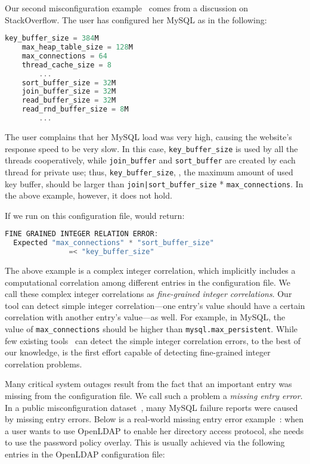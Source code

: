 \label{ex:fine}
Our second misconfiguration example~\cite{correlation} 
comes from a discussion on StackOverflow.
The user has configured her MySQL as in the following:

\begin{lstlisting}[language=C, xleftmargin=.01\textwidth]
    key_buffer_size = 384M
    max_heap_table_size = 128M
    max_connections = 64
    thread_cache_size = 8
        ...
    sort_buffer_size = 32M
    join_buffer_size = 32M
    read_buffer_size = 32M
    read_rnd_buffer_size = 8M
        ...
\end{lstlisting} 

The user complains that her MySQL load was very high, 
causing the website's
response speed to be very slow.
In this case, {\tt key\_buffer\_size} is used by all the threads
cooperatively, while {\tt join\_buffer} and {\tt sort\_buffer} are 
created by each thread for private use; thus, {\tt key\_buffer\_size},
\ie, the maximum amount of used key buffer, should be larger than 
{\tt join|sort\_buffer\_size} * {\tt max\_connections}. 
In the above example, however, it does not hold. 

If we run \app on this configuration file, \app  would return:

\begin{lstlisting}[language=C, xleftmargin=.01\textwidth]
  FINE GRAINED INTEGER RELATION ERROR:
  Expected "max_connections" * "sort_buffer_size"
               =< "key_buffer_size"
\end{lstlisting} 

The above example is a complex integer correlation, which implicitly
includes a computational correlation among different entries
in the configuration file.
We call these complex integer correlations as 
{\em fine-grained integer correlations}. 
Our tool can detect simple integer correlation---one entry's
value should have a certain correlation with another entry's 
value---as well.
For example, in MySQL, the value of {\tt max\_connections} 
should be higher than {\tt mysql.max\_persistent}.
While few existing tools~\cite{yin11anempirical, zhang14encore}
can detect the simple integer correlation errors,
to the best of our knowledge, \app is the first effort capable of
detecting fine-grained integer correlation problems.

Many critical system outages result from the fact that an important
entry was missing from the configuration file. 
We call such a problem a {\em missing entry error}.
In a public misconfiguration dataset~\cite{configdataset},
many MySQL failure reports were caused by
missing entry errors.
Below is a real-world missing entry error example~\cite{yin11anempirical}:
when a user wants to use OpenLDAP to enable her directory access
protocol, she needs to use the password policy overlay. This is usually
achieved via the following entries in the OpenLDAP configuration file:

